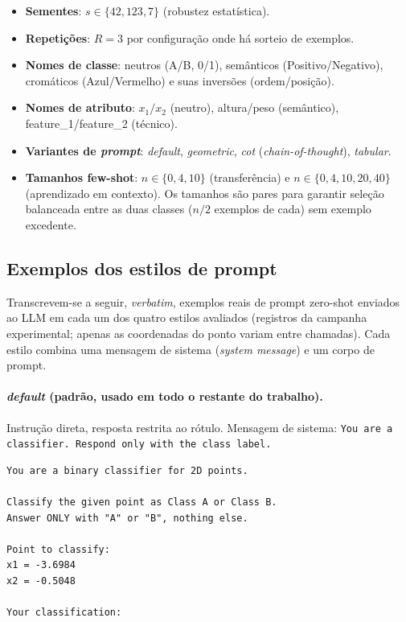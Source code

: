\documentclass[12pt,a4paper]{article}
\begin{document}
\begin{itemize}
  \item \textbf{Sementes}: $s \in \{42, 123, 7\}$ (robustez estatística).
  \item \textbf{Repetições}: $R = 3$ por configuração onde há sorteio de exemplos.
  \item \textbf{Nomes de classe}: neutros (A/B, 0/1), semânticos (Positivo/Negativo),
    cromáticos (Azul/Vermelho) e suas inversões (ordem/posição).
  \item \textbf{Nomes de atributo}: $x_1/x_2$ (neutro), altura/peso (semântico),
    feature\_1/feature\_2 (técnico).
  \item \textbf{Variantes de \emph{prompt}}: \emph{default}, \emph{geometric}, \emph{cot}
    (\emph{chain-of-thought}), \emph{tabular}.
  \item \textbf{Tamanhos few-shot}: $n \in \{0,4,10\}$ (transferência) e
    $n \in \{0,4,10,20,40\}$ (aprendizado em contexto). Os tamanhos são pares para
    garantir seleção
    balanceada entre as duas classes ($n/2$ exemplos de cada) sem exemplo excedente.
\end{itemize}

\subsection{Exemplos dos estilos de prompt}
\label{ap:prompts}

Transcrevem-se a seguir, \emph{verbatim}, exemplos reais de prompt zero-shot enviados ao
LLM em cada um dos quatro estilos avaliados (registros da campanha experimental; apenas as
coordenadas do ponto variam entre chamadas). Cada estilo combina uma mensagem de sistema
(\emph{system message}) e um corpo de prompt.

\paragraph{\emph{default} (padrão, usado em todo o restante do trabalho).}
Instrução direta, resposta restrita ao rótulo.
Mensagem de sistema: \texttt{You are a classifier. Respond only with the class label.}
\begin{verbatim}
You are a binary classifier for 2D points.

Classify the given point as Class A or Class B.
Answer ONLY with "A" or "B", nothing else.

Point to classify:
x1 = -3.6984
x2 = -0.5048

Your classification:
\end{verbatim}
\end{document}
